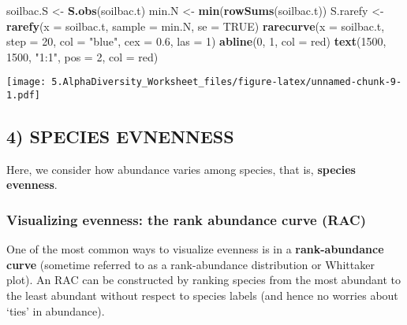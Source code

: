 \documentclass[
]{article}
\newenvironment{Shaded}{\begin{snugshade}}{\end{snugshade}}
\newcommand{\AttributeTok}[1]{\textcolor[rgb]{0.13,0.29,0.53}{#1}}
\newcommand{\ConstantTok}[1]{\textcolor[rgb]{0.56,0.35,0.01}{#1}}
\newcommand{\DecValTok}[1]{\textcolor[rgb]{0.00,0.00,0.81}{#1}}
\newcommand{\FloatTok}[1]{\textcolor[rgb]{0.00,0.00,0.81}{#1}}
\newcommand{\FunctionTok}[1]{\textcolor[rgb]{0.13,0.29,0.53}{\textbf{#1}}}
\newcommand{\NormalTok}[1]{#1}
\newcommand{\OtherTok}[1]{\textcolor[rgb]{0.56,0.35,0.01}{#1}}
\newcommand{\StringTok}[1]{\textcolor[rgb]{0.31,0.60,0.02}{#1}}
\begin{document}
\begin{Shaded}
\begin{Highlighting}[]
\NormalTok{soilbac.S }\OtherTok{\textless{}{-}} \FunctionTok{S.obs}\NormalTok{(soilbac.t)}
\NormalTok{min.N }\OtherTok{\textless{}{-}} \FunctionTok{min}\NormalTok{(}\FunctionTok{rowSums}\NormalTok{(soilbac.t))}
\NormalTok{S.rarefy }\OtherTok{\textless{}{-}} \FunctionTok{rarefy}\NormalTok{(}\AttributeTok{x =}\NormalTok{ soilbac.t, }\AttributeTok{sample =}\NormalTok{ min.N, }\AttributeTok{se =} \ConstantTok{TRUE}\NormalTok{)}
\FunctionTok{rarecurve}\NormalTok{(}\AttributeTok{x =}\NormalTok{ soilbac.t, }\AttributeTok{step =} \DecValTok{20}\NormalTok{, }\AttributeTok{col =} \StringTok{"blue"}\NormalTok{, }\AttributeTok{cex =} \FloatTok{0.6}\NormalTok{, }\AttributeTok{las =} \DecValTok{1}\NormalTok{)}
\FunctionTok{abline}\NormalTok{(}\DecValTok{0}\NormalTok{, }\DecValTok{1}\NormalTok{, }\AttributeTok{col =} \StringTok{\textquotesingle{}red\textquotesingle{}}\NormalTok{)}
\FunctionTok{text}\NormalTok{(}\DecValTok{1500}\NormalTok{, }\DecValTok{1500}\NormalTok{, }\StringTok{"1:1"}\NormalTok{, }\AttributeTok{pos =} \DecValTok{2}\NormalTok{, }\AttributeTok{col =} \StringTok{\textquotesingle{}red\textquotesingle{}}\NormalTok{)}
\end{Highlighting}
\end{Shaded}

\texttt{[image: 5.AlphaDiversity\_Worksheet\_files/figure-latex/unnamed-chunk-9-1.pdf]}

\subsection{4) SPECIES EVNENNESS}\label{species-evnenness}

Here, we consider how abundance varies among species, that is,
\textbf{species evenness}.

\subsubsection{Visualizing evenness: the rank abundance curve
(RAC)}\label{visualizing-evenness-the-rank-abundance-curve-rac}

One of the most common ways to visualize evenness is in a
\textbf{rank-abundance curve} (sometime referred to as a rank-abundance
distribution or Whittaker plot). An RAC can be constructed by ranking
species from the most abundant to the least abundant without respect to
species labels (and hence no worries about `ties' in abundance).
\end{document}

